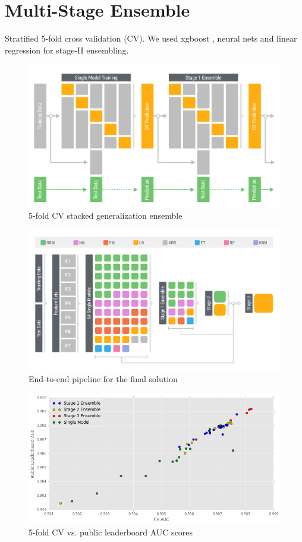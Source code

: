 \section{Multi-Stage Ensemble}
Stratified 5-fold cross validation (CV).
We used xgboost \cite{xgboost}, neural nets and linear regression for stage-II ensembling.

\begin{figure}[!ht]
  \caption{5-fold CV stacked generalization ensemble}
  \centering
    \includegraphics[width=0.5 \textwidth]{cv_ensemble}
\end{figure}

\begin{figure}[!ht]
  \caption{End-to-end pipeline for the final solution}
  \centering
    \includegraphics[width=1 \textwidth]{ensemble}
\end{figure}

\begin{figure}[!ht]
  \caption{5-fold CV vs. public leaderboard AUC scores}
  \centering
    \includegraphics[width=1 \textwidth]{cv_lb}
\end{figure}

